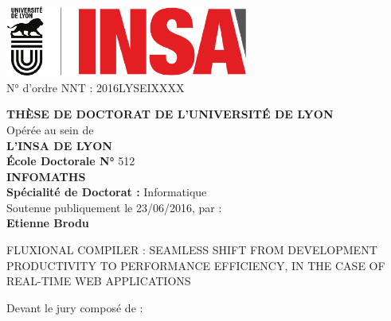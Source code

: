 \begin{center}
\includegraphics[width=8cm]{../resources/logos.pdf}%
\\[1em]


{N° d'ordre NNT : 2016LYSEIXXXX \hfill}

\vfill
{
  \fontsize{14pt}{16pt}\selectfont%

  {\large\textbf{\MakeUppercase{Thèse de doctorat de l'université de Lyon}}}\\[1em]

  Opérée au sein de\\
  {\large\textbf{\MakeUppercase{L'INSA de Lyon}}}\\[1em]

  {\large\textbf{École Doctorale N° }512}\\
  {\large\textbf{\MakeUppercase{InfoMaths}}}\\[1em]

  {\large\textbf{Spécialité de Doctorat : }Informatique}\\[1em]

  Soutenue publiquement le 23/06/2016, par :\\
  {\large\textbf{Etienne Brodu}}\\[1em]
}

\vfill

\parbox{\linewidth}{%
\vspace{10pt}
\redline%
\vspace{10pt}
\secfont\fontsize{20pt}{25pt}\selectfont%
\MakeUppercase{Fluxional compiler : seamless shift from development productivity to performance efficiency, in the case of real-time web applications}%
\vspace{10pt}%
\redline%
\vspace{10pt}
}

\vfill

Devant le jury composé de : \\[1em]


\end{center}
